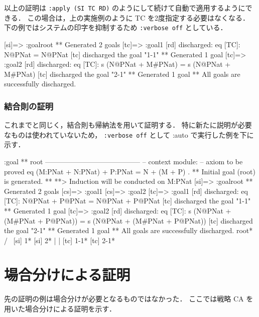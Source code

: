 \documentclass[a4paper,oneside,10pt,here]{memoir}
\newenvironment{vvtm}%
{\parskip=0pt\lineskip=0pt\begin{center}\begin{minipage}{0.8\textwidth}\begin{snugshade}}%
  {\end{snugshade}\end{minipage}\end{center}}
\begin{document}
以上の証明は \verb|:apply (SI TC RD)| のようにして続けて自動で適用するようにできる．
この場合は，上の実施例のように TC を2度指定する必要はなくなる．
下の例ではシステムの印字を抑制するため \verb|:verbose off| としている．
\begin{vvtm}
  \begin{simplev}

[si]=> :goal{root}
** Generated 2 goals
[tc]=> :goal{1}
[rd] discharged: 
  eq [TC]: N@PNat = N@PNat
[tc] discharged the goal "1-1"
** Generated 1 goal
[tc]=> :goal{2}
[rd] discharged: 
  eq [TC]: s (N@PNat + M#PNat) = s (N@PNat + M#PNat)
[tc] discharged the goal "2-1"
** Generated 1 goal
** All goals are successfully discharged.
  \end{simplev}
\end{vvtm}

\subsubsection{結合則の証明}
これまでと同じく，結合則も帰納法を用いて証明する．
特に新たに説明が必要なものは使われていないため，
\verb|:verbose off| として :auto で実行した例を下に示す．
\begin{vvtm}
  \begin{simplev}
:goal { ** root -----------------------------------------
  -- context module: %
  -- axiom to be proved
    eq (M:PNat + N:PNat) + P:PNat = N + (M + P) .
}
** Initial goal (root) is generated. **
**> Induction will be conducted on M:PNat 
[si]=> :goal{root}
** Generated 2 goals
[cs]=> :goal{1}
[cs]=> :goal{2}
[tc]=> :goal{1}
[rd] discharged: 
  eq [TC]: N@PNat + P@PNat = N@PNat + P@PNat
[tc] discharged the goal "1-1"
** Generated 1 goal
[tc]=> :goal{2}
[rd] discharged: 
  eq [TC]: s (N@PNat + (M#PNat + P@PNat))
      = s (N@PNat + (M#PNat + P@PNat))
[tc] discharged the goal "2-1"
** Generated 1 goal
** All goals are successfully discharged.
       root*        
    /          \     
 [si] 1*    [si] 2* 
    |          |     
[tc] 1-1*  [tc] 2-1*
  \end{simplev}
\end{vvtm}

\section{場合分けによる証明}
先の証明の例は場合分けが必要となるものではなかった．
ここでは戦略 CA を用いた場合分けによる証明を示す．
\end{document}
